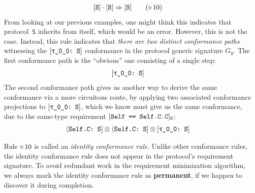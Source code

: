 \documentclass[../generics]{subfiles}
\begin{document}
\begin{example}
\begin{gather*}
\ProtoConf{\protosym{S}}{S}\tag{$\CRule{10}$}
\end{gather*}
From looking at our previous examples, one might think this indicates that protocol~\texttt{S} inherits from itself, which would be an error. However, this is not the case. Instead, this rule indicates that \textsl{there are two distinct conformance paths} witnessing the $\ConfReq{\rT}{S}$ conformance in the protocol generic signature $G_{\texttt{S}}$. The first conformance path is the ``obvious'' one consisting of a single step:
\[
\ConfReq{\rT}{S}
\]
The second conformance path gives us another way to derive the same conformance via a more circuitous route, by applying two associated conformance projections to $\ConfReq{\rT}{S}$, which we know must give us the same conformance, due to the same-type requirement $[\texttt{Self == Self.C.C}]_{\texttt{S}}$:
\[
\AssocConf{Self.C}{S} \otimes \AssocConf{Self.C}{S} \otimes \ConfReq{\rT}{S}
\]

Rule $\diamond\, 10$ is called an \emph{identity conformance rule}. Unlike other conformance rules, the identity conformance rule does not appear in the protocol's requirement signature. To avoid redundant work in the requirement minimization algorithm, we always mark the identity conformance rule as \textbf{permanent}, if we happen to discover it during completion.


\end{example}
\end{document}
